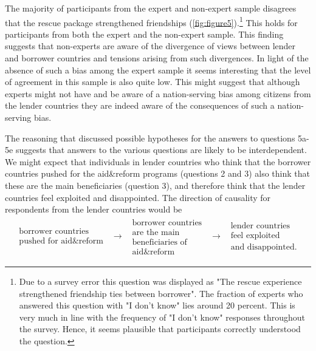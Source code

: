 The majority of participants from the expert and non-expert sample disagrees that 
the rescue package strengthened friendships (\autoref{fig:figure5}).\footnote{Due to a survey error this question was displayed as "The rescue experience strengthened friendship ties between borrower". The fraction of experts who answered this question with "I don't know" lies around 20 percent. This is very much in line with the frequency of "I don't know" responses throughout the survey. Hence, it seems plausible that participants correctly understood the question. } This holds for participants from 
both the expert and the non-expert sample. This finding suggests that non-experts are aware of the divergence of views between lender and borrower countries and tensions arising from such divergences. In light of the absence of such a bias among the expert sample 
it seems interesting that the level of agreement in this sample is also quite low. 
This might suggest that although experts might not have and be aware of a nation-serving bias
among citizens from the lender countries they are indeed aware of the consequences of such 
a nation-serving bias. 


The reasoning that discussed possible hypotheses for the answers to
questions 5a-5e suggests that answers to the various questions are likely to
be interdependent. We might expect that individuals in lender countries who
think that the borrower countries pushed for the aid\&reform programs
(questions 2 and 3) also think that these are the main beneficiaries
(question 3), and therefore think that the lender countries feel exploited
and disappointed. The direction of causality for respondents from the lender
countries would be%
\begin{equation*}
\begin{array}{ccccc}
\begin{array}{c}
\text{borrower countries} \\ 
\text{pushed for aid\&reform}%
\end{array}
& \rightarrow  & 
\begin{array}{c}
\text{borrower countries} \\ 
\text{are the main} \\ 
\text{beneficiaries of} \\ 
\text{aid\&reform}%
\end{array}
& \rightarrow  & 
\begin{array}{c}
\text{lender countries} \\ 
\text{feel exploited} \\ 
\text{and disappointed.}%
\end{array}%
 \end{array}%
 \end{equation*}


